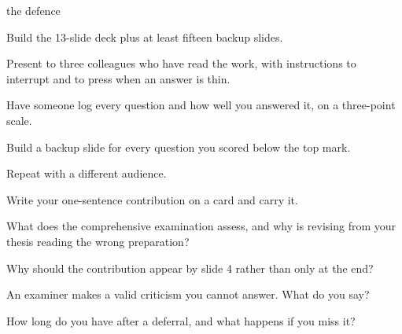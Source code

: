 \begin{traditions}{the defence}
\end{traditions}

\begin{lab}
\begin{tightnum}
  \item Build the 13-slide deck plus at least fifteen backup slides.
  \item Present to three colleagues who have read the work, with instructions
    to interrupt and to press when an answer is thin.
  \item Have someone log every question and how well you answered it, on a
    three-point scale.
  \item Build a backup slide for every question you scored below the top mark.
  \item Repeat with a different audience.
  \item Write your one-sentence contribution on a card and carry it.
\end{tightnum}
\end{lab}

\begin{checkpoint}
\begin{tightnum}
  \item What does the comprehensive examination assess, and why is revising
    from your thesis reading the wrong preparation?
  \item Why should the contribution appear by slide 4 rather than only at the
    end?
  \item An examiner makes a valid criticism you cannot answer. What do you say?
  \item How long do you have after a deferral, and what happens if you miss it?
\end{tightnum}
\end{checkpoint}

